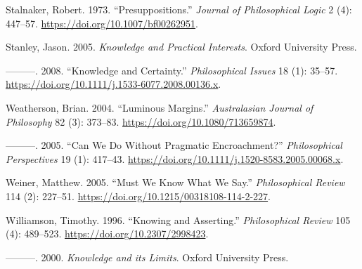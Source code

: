 \documentclass[
  11pt,
  letterpaper,
  DIV=11,
  numbers=noendperiod]{scrartcl}
\newlength{\cslhangindent}
\newenvironment{CSLReferences}[2] %
 {\begin{list}{}{%
  \setlength{\itemindent}{0pt}
  \setlength{\leftmargin}{0pt}
  \setlength{\parsep}{0pt}
  \ifodd #1
   \setlength{\leftmargin}{\cslhangindent}
   \setlength{\itemindent}{-1\cslhangindent}
  \fi
  \setlength{\itemsep}{#2\baselineskip}}}
 {\end{list}}
\begin{document}
\begin{CSLReferences}{1}{0}
Stalnaker, Robert. 1973. {``{Presuppositions}.''} \emph{Journal of
Philosophical Logic} 2 (4): 447--57.
\url{https://doi.org/10.1007/bf00262951}.

Stanley, Jason. 2005. \emph{{Knowledge and Practical Interests}}. Oxford
University Press.

---------. 2008. {``{Knowledge and Certainty}.''} \emph{Philosophical
Issues} 18 (1): 35--57.
\url{https://doi.org/10.1111/j.1533-6077.2008.00136.x}.

Weatherson, Brian. 2004. {``Luminous Margins.''} \emph{Australasian
Journal of Philosophy} 82 (3): 373--83.
\url{https://doi.org/10.1080/713659874}.

---------. 2005. {``{Can We Do Without Pragmatic Encroachment?}''}
\emph{Philosophical Perspectives} 19 (1): 417--43.
\url{https://doi.org/10.1111/j.1520-8583.2005.00068.x}.

Weiner, Matthew. 2005. {``Must We Know What We Say.''}
\emph{Philosophical Review} 114 (2): 227--51.
\url{https://doi.org/10.1215/00318108-114-2-227}.

Williamson, Timothy. 1996. {``{Knowing and Asserting}.''}
\emph{Philosophical Review} 105 (4): 489--523.
\url{https://doi.org/10.2307/2998423}.

---------. 2000. \emph{{Knowledge and its Limits}}. Oxford University
Press.

\end{CSLReferences}
\end{document}
